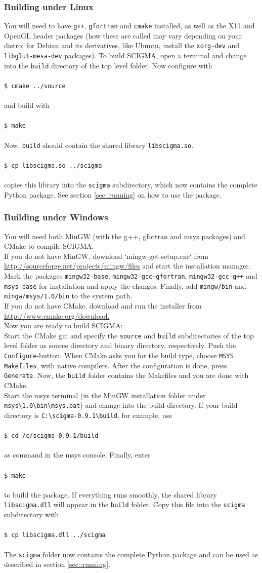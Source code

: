 \documentclass[10pt,a4paper,titlepage]{article}
\newcommand{\T}[1]{\texttt{#1}}
\newcommand{\C}[1]{\\\\\T{#1}\\\\}
\begin{document}
\subsubsection{Building under Linux}
You will need to have \T{g++}, \T{gfortran} and \T{cmake} installed, as well as the X11 and OpenGL header packages (how these are called may vary depending on your distro; for Debian and its derivatives, like Ubuntu, install the \T{xorg-dev} and \T{libglu1-mesa-dev} packages).
 To build SCIGMA, open a terminal and change into the \T{build} directory of the
 top level folder. Now configure with
 \C{\$ cmake ../source}
 and build with
 \C{\$ make}
 Now, \T{build} should contain the shared library \T{libscigma.so}.
 \C{\$ cp libscigma.so ../scigma}
 copies this library into the \T{scigma} subdirectory, which now contains the
 complete Python package. See section \ref{sec::running} on how to use the package.	 
\subsubsection{Building under Windows}
You will need both MinGW (with the g++, gfortran and msys packages) and CMake
to compile SCIGMA.\\
If you do not have MinGW, download `mingw-get-setup.exe` from \url{http://sourceforge.net/projects/mingw/files} and start the installation manager. Mark the packages \T{mingw32-base}, \T{mingw32-gcc-gfortran}, \T{mingw32-gcc-g++} and \T{msys-base} for installation and
apply the changes. Finally, add \T{mingw/bin} and \T{mingw/msys/1.0/bin} to the system path.\\
If you do not have CMake, download and run the installer from \url{http://www.cmake.org/download.}\\
Now you are ready to build SCIGMA:\\  
Start the CMake gui and specify the \T{source} and \T{build} subdirectories of the top level folder as source directory and binary directory, respectively. Push the \T{Configure}-button. When CMake asks you for the build type, choose
 \T{MSYS Makefiles}, with native compilers. After the configuration is done, press \T{Generate}. Now, the \T{build} folder contains the Makefiles and you are done with CMake. \\
Start the msys terminal (in the MinGW installation folder under \T{msys\textbackslash1.0\textbackslash bin\textbackslash msys.bat}) and change into the build directory. If your build
directory is \T{C:\textbackslash scigma-0.9.1\textbackslash build}, for example, use
\C{\$ cd /c/scigma-0.9.1/build}
as command in the msys console. Finally, enter
\C{\$ make}
to build the package. If everything runs smoothly, the shared library \T{libscigma.dll} will appear in the \T{build} folder. Copy this file into the
\T{scigma} subdirectory with
\C{\$ cp libscigma.dll ../scigma}
The \T{scigma} folder now contains the complete Python package and can be used as described in section \ref{sec::running}.
\end{document}
